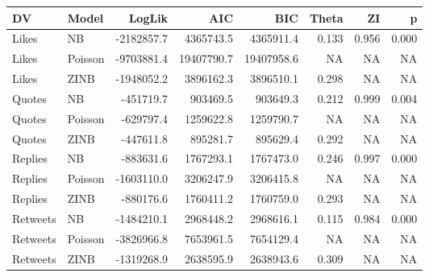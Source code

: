 
\begin{tabular}{llrrrrrr}
\toprule
DV & Model & LogLik & AIC & BIC & Theta & ZI & p\\
\midrule
Likes & NB & -2182857.7 & 4365743.5 & 4365911.4 & 0.133 & 0.956 & 0.000\\
Likes & Poisson & -9703881.4 & 19407790.7 & 19407958.6 & NA & NA & NA\\
Likes & ZINB & -1948052.2 & 3896162.3 & 3896510.1 & 0.298 & NA & NA\\
Quotes & NB & -451719.7 & 903469.5 & 903649.3 & 0.212 & 0.999 & 0.004\\
Quotes & Poisson & -629797.4 & 1259622.8 & 1259790.7 & NA & NA & NA\\
Quotes & ZINB & -447611.8 & 895281.7 & 895629.4 & 0.292 & NA & NA\\
Replies & NB & -883631.6 & 1767293.1 & 1767473.0 & 0.246 & 0.997 & 0.000\\
Replies & Poisson & -1603110.0 & 3206247.9 & 3206415.8 & NA & NA & NA\\
Replies & ZINB & -880176.6 & 1760411.2 & 1760759.0 & 0.293 & NA & NA\\
Retweets & NB & -1484210.1 & 2968448.2 & 2968616.1 & 0.115 & 0.984 & 0.000\\
Retweets & Poisson & -3826966.8 & 7653961.5 & 7654129.4 & NA & NA & NA\\
Retweets & ZINB & -1319268.9 & 2638595.9 & 2638943.6 & 0.309 & NA & NA\\
\bottomrule
\end{tabular}
